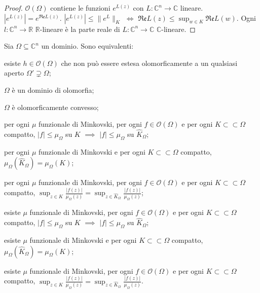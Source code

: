 \begin{proof}
  $\mathcal{O}(\Omega)$ contiene le funzioni $e^{L(z)}$ con $L: \mathbb{C}^n \longrightarrow \mathbb{C}$ lineare. $|e^{L(z)}|=e^{\mathfrak{Re}L(z)}$. $|e^{L(z)}| \le \|e^L\|_K$ $\iff$ $\displaystyle \mathfrak{Re}L(z) \le \sup_{w \in K} \mathfrak{Re}L(w)$.
  Ogni $l: \mathbb{C}^n \longrightarrow \mathbb{R}$ $\mathbb{R}$-lineare è la parte reale di $L:\mathbb{C}^n \longrightarrow \mathbb{C}$ $\mathbb{C}$-lineare.
\end{proof}

\begin{thm}
  Sia $\Omega \subseteq \mathbb{C}^n$ un dominio. Sono equivalenti:
  \begin{nlist}
    \item esiste $h \in \mathcal{O}(\Omega)$ che non può essere estesa olomorficamente a un qualsiasi aperto $\Omega' \supsetneq \Omega$;
    \item $\Omega$ è un dominio di olomorfia;
    \item $\Omega$ è olomorficamente convesso;
    \item per ogni $\mu$ funzionale di Minkovski, per ogni $f \in \mathcal{O}(\Omega)$ e per ogni $K \subset\subset \Omega$ compatto, $|f| \le \mu_{\Omega}$ su $K$ $\implies$ $|f| \le \mu_\Omega$ su $\hat{K}_\Omega$;
    \item per ogni $\mu$ funzionale di Minkovski e per ogni $K \subset\subset \Omega$ compatto, $\mu_{\Omega}(\hat{K}_\Omega)=\mu_\Omega(K)$;
    \item per ogni $\mu$ funzionale di Minkovski, per ogni $f \in \mathcal{O}(\Omega)$ e per ogni $K \subset\subset \Omega$ compatto, $\displaystyle \sup_{z \in K} \frac{|f(z)|}{\mu_\Omega(z)}=\sup_{z\in\hat{K}_\Omega} \frac{|f(z)|}{\mu_\Omega(z)}$;
    \item esiste $\mu$ funzionale di Minkovski, per ogni $f \in \mathcal{O}(\Omega)$ e per ogni $K \subset\subset \Omega$ compatto, $|f| \le \mu_{\Omega}$ su $K$ $\implies$ $|f| \le \mu_\Omega$ su $\hat{K}_\Omega$;
    \item esiste $\mu$ funzionale di Minkovski e per ogni $K \subset\subset \Omega$ compatto, $\mu_{\Omega}(\hat{K}_\Omega)=\mu_\Omega(K)$;
    \item esiste $\mu$ funzionale di Minkovski, per ogni $f \in \mathcal{O}(\Omega)$ e per ogni $K \subset\subset \Omega$ compatto, $\displaystyle \sup_{z \in K} \frac{|f(z)|}{\mu_\Omega(z)}=\sup_{z\in\hat{K}_\Omega} \frac{|f(z)|}{\mu_\Omega(z)}$.
  \end{nlist}
\end{thm}

